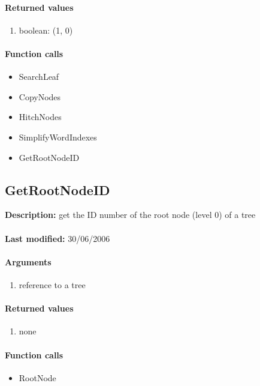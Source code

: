 \paragraph{Returned values}
\begin{enumerate}
\item boolean: (1, 0)
\end{enumerate}

\paragraph{Function calls}
\begin{itemize}
\item SearchLeaf
\item CopyNodes
\item HitchNodes
\item SimplifyWordIndexes
\item GetRootNodeID
\end{itemize}

\subsection{GetRootNodeID}
\textbf{Description:} get the ID number of the root node (level 0) of a tree\\
\\\textbf{Last modified:} 30/06/2006

\paragraph{Arguments}
\begin{enumerate}
\item reference to a tree
\end{enumerate}

\paragraph{Returned values}
\begin{enumerate}
\item none
\end{enumerate}

\paragraph{Function calls}
\begin{itemize}
\item RootNode
\end{itemize}

